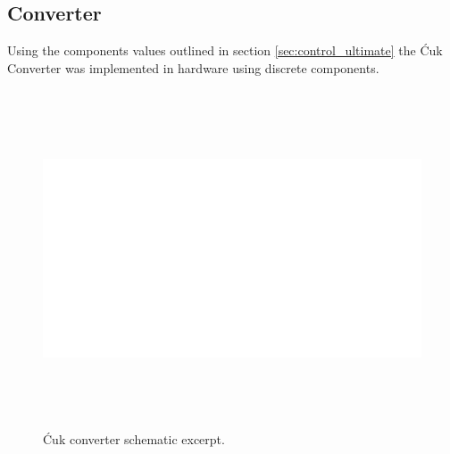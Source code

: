 \subsection{Converter}
Using the components values outlined in section \ref{sec:control_ultimate} the \'Cuk Converter was implemented in hardware using discrete components.
\begin{figure}
    \centering
    \includegraphics[height = 10cm]{figures/hardware/black.jpg}
    \caption{\'Cuk converter schematic excerpt.}
    \label{fig:converter_schematic}
\end{figure}